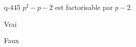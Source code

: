 \begin{truefalse}{q-445}
$p^2-p-2$ est factorisable par $p-2$.
\item* Vrai
\item Faux
\end{truefalse}

